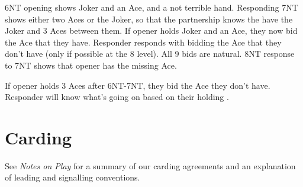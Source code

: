 \documentclass[a4paper]{JoshCards}
\begin{document}
6NT opening shows Joker and an Ace, and a not terrible hand. Responding 7NT shows either two Aces or the Joker, so that the partnership knows the have the Joker and 3 Aces between them. If opener holds Joker and an Ace, they now bid the Ace that they have. Responder responds with bidding the Ace that they don't have (only if possible at the 8 level). All 9 bids are natural. 8NT response to 7NT shows that opener has the missing Ace.

If opener holds 3 Aces after 6NT-7NT, they bid the Ace they don't have. Responder will know what's going on based on their holding . 


\newpage
\chapter*{Carding}

See \textit{Notes on Play} for a summary of our carding agreements and an explanation of leading and signalling conventions.
\end{document}
